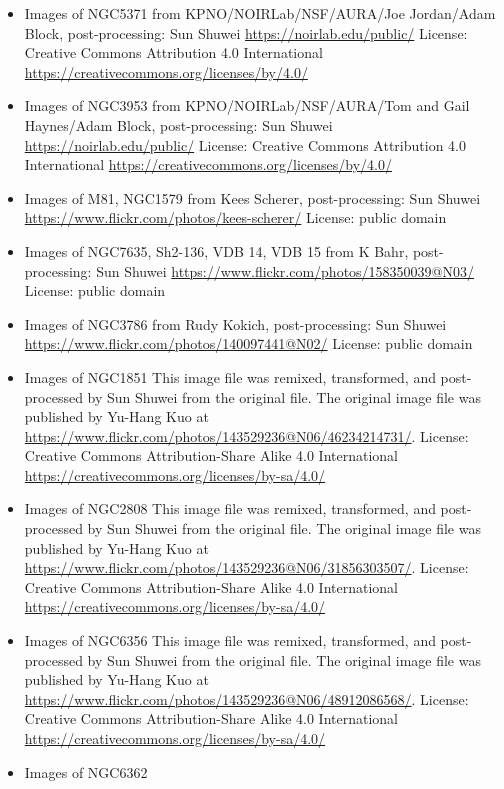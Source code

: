 \begin{itemize}
	 \url{https://www.flickr.com/}
	 License: Creative Commons Attribution-ShareAlike 4.0 International \url{https://creativecommons.org/licenses/by-sa/4.0/} 
\item Images of NGC5371
	 from KPNO/NOIRLab/NSF/AURA/Joe Jordan/Adam Block, post-processing: Sun Shuwei
	 \url{https://noirlab.edu/public/}
	 License: Creative Commons Attribution 4.0 International \url{https://creativecommons.org/licenses/by/4.0/}
\item Images of NGC3953
	 from KPNO/NOIRLab/NSF/AURA/Tom and Gail Haynes/Adam Block, post-processing: Sun Shuwei
	 \url{https://noirlab.edu/public/}
	 License: Creative Commons Attribution 4.0 International \url{https://creativecommons.org/licenses/by/4.0/}
\item Images of M81, NGC1579
	 from Kees Scherer, post-processing: Sun Shuwei
	 \url{https://www.flickr.com/photos/kees-scherer/}
	 License: public domain
\item Images of NGC7635, Sh2-136, VDB 14, VDB 15
	 from K Bahr, post-processing: Sun Shuwei
	 \url{https://www.flickr.com/photos/158350039@N03/}
	 License: public domain
\item Images of NGC3786
	 from Rudy Kokich, post-processing: Sun Shuwei
	 \url{https://www.flickr.com/photos/140097441@N02/}
	 License: public domain
\item Images of NGC1851
	 This image file was remixed, transformed, and post-processed by Sun Shuwei from the original file. The original image file was published by Yu-Hang Kuo at \url{https://www.flickr.com/photos/143529236@N06/46234214731/}.
	 License: Creative Commons Attribution-Share Alike 4.0 International \url{https://creativecommons.org/licenses/by-sa/4.0/}
\item Images of NGC2808
	 This image file was remixed, transformed, and post-processed by Sun Shuwei from the original file. The original image file was published by Yu-Hang Kuo at \url{https://www.flickr.com/photos/143529236@N06/31856303507/}.
	 License: Creative Commons Attribution-Share Alike 4.0 International \url{https://creativecommons.org/licenses/by-sa/4.0/}
\item Images of NGC6356
	 This image file was remixed, transformed, and post-processed by Sun Shuwei from the original file. The original image file was published by Yu-Hang Kuo at \url{https://www.flickr.com/photos/143529236@N06/48912086568/}.
	 License: Creative Commons Attribution-Share Alike 4.0 International \url{https://creativecommons.org/licenses/by-sa/4.0/}
\item Images of NGC6362

\end{itemize}
